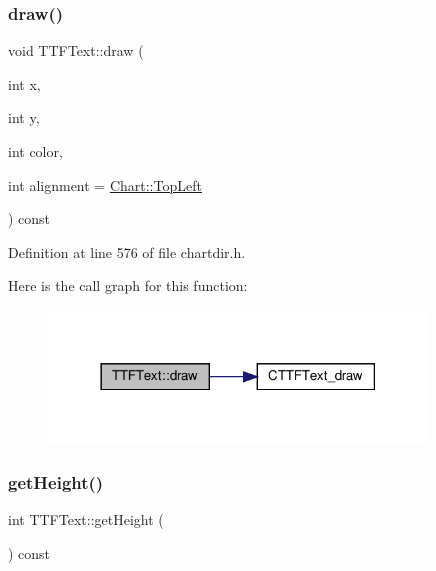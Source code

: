 \mbox{\label{class_t_t_f_text_a28c985af7f82f03fd73747c5d565b8c1}} 
\subsubsection{\texorpdfstring{draw()}{draw()}}
{\footnotesize\ttfamily void T\+T\+F\+Text\+::draw (\begin{DoxyParamCaption}\item[{int}]{x,  }\item[{int}]{y,  }\item[{int}]{color,  }\item[{int}]{alignment = {\ttfamily \hyperlink{namespace_chart_ae222e51ce11a254450b6ddfbc862680aa0bf92d1d2d6713aa62e92b86b9a8532f}{Chart\+::\+Top\+Left}} }\end{DoxyParamCaption}) const\hspace{0.3cm}{\ttfamily [inline]}}



Definition at line 576 of file chartdir.\+h.

Here is the call graph for this function\+:
\nopagebreak
\begin{figure}[H]
\begin{center}
\leavevmode
\includegraphics[width=285pt]{class_t_t_f_text_a28c985af7f82f03fd73747c5d565b8c1_cgraph}
\end{center}
\end{figure}
\mbox{\label{class_t_t_f_text_a0b41f8472f607369f6a0eda4a6b5f84f}} 
\subsubsection{\texorpdfstring{get\+Height()}{getHeight()}}
{\footnotesize\ttfamily int T\+T\+F\+Text\+::get\+Height (\begin{DoxyParamCaption}{ }\end{DoxyParamCaption}) const\hspace{0.3cm}{\ttfamily [inline]}}



